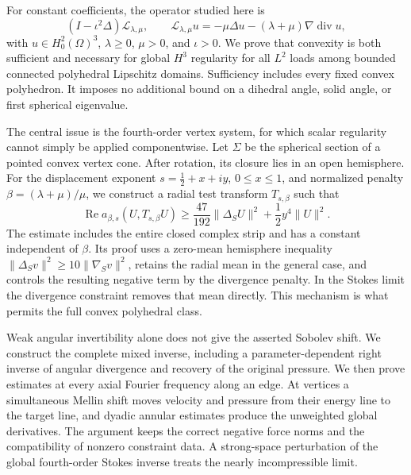 \documentclass[11pt,a4paper]{article}
\theoremstyle{remark}
\numberwithin{equation}{section}
\begin{document}
For constant coefficients, the operator studied here is
\[
 (I-\iota^2\Delta)\mathcal L_{\lambda,\mu},
 \qquad
 \mathcal L_{\lambda,\mu}u=-\mu\Delta u
                  -(\lambda+\mu)\nabla\operatorname{div}u,
\]
with \(u\in H^2_0(\Omega)^3\), \(\lambda\ge0\), \(\mu>0\), and
\(\iota>0\). We prove that convexity is both sufficient and necessary for
global \(H^3\) regularity for all \(L^2\) loads among bounded connected
polyhedral Lipschitz domains. Sufficiency includes every fixed convex
polyhedron. It imposes no additional bound on a dihedral angle, solid
angle, or first spherical eigenvalue.

The central issue is the fourth-order vertex system, for which scalar
regularity cannot simply be applied componentwise. Let \(\Sigma\) be the
spherical section of a pointed convex vertex cone. After rotation, its
closure lies in an open hemisphere. For the displacement exponent
\(s=\tfrac12+x+iy\), \(0\le x\le1\), and normalized penalty
\(\beta=(\lambda+\mu)/\mu\), we construct a radial test transform
\(T_{s,\beta}\) such that
\[
 \operatorname{Re}a_{\beta,s}(U,T_{s,\beta}U)
 \ge\frac{47}{192}\|\Delta_SU\|^2
       +\frac12y^4\|U\|^2.
\]
The estimate includes the entire closed complex strip and has a constant
independent of \(\beta\). Its proof uses a zero-mean hemisphere inequality
\(\|\Delta_Sv\|^2\ge10\|\nabla_Sv\|^2\), retains the radial mean in the
general case, and controls the resulting negative term by the
divergence penalty. In the Stokes limit the divergence constraint removes
that mean directly. This mechanism is what permits the full convex
polyhedral class.

Weak angular invertibility alone does not give the asserted Sobolev
shift. We construct the complete mixed inverse, including a
parameter-dependent right inverse of angular divergence and recovery of
the original pressure. We then prove estimates at every axial Fourier
frequency along an edge. At vertices a simultaneous Mellin shift moves
velocity and pressure from their energy line to the target line, and
dyadic annular estimates produce the unweighted global derivatives.
The argument keeps the correct negative force norms and the compatibility
of nonzero constraint data. A strong-space perturbation of the global
fourth-order Stokes inverse treats the nearly incompressible limit.
\end{document}

